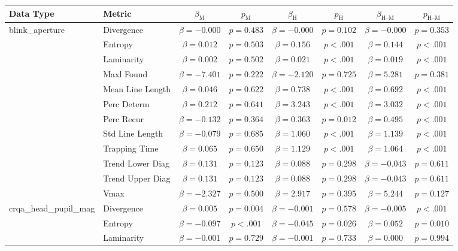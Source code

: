 \begin{tabular}{llcc|cc|cc}
\toprule
Data Type & Metric & $\beta_{\text{M}}$ & $p_{\text{M}}$ & $\beta_{\text{H}}$ & $p_{\text{H}}$ & $\beta_{\text{H--M}}$ & $p_{\text{H--M}}$ \\
\midrule
\multirow{12}{*}{blink_aperture} & Divergence & $\beta = -0.000$ & $p = 0.483$ & $\beta = -0.000$ & $p = 0.102$ & $\beta = -0.000$ & $p = 0.353$ \\
 & Entropy & $\beta = 0.012$ & $p = 0.503$ & $\beta = 0.156$ & $p < .001$ & $\beta = 0.144$ & $p < .001$ \\
 & Laminarity & $\beta = 0.002$ & $p = 0.502$ & $\beta = 0.021$ & $p < .001$ & $\beta = 0.019$ & $p < .001$ \\
 & Maxl Found & $\beta = -7.401$ & $p = 0.222$ & $\beta = -2.120$ & $p = 0.725$ & $\beta = 5.281$ & $p = 0.381$ \\
 & Mean Line Length & $\beta = 0.046$ & $p = 0.622$ & $\beta = 0.738$ & $p < .001$ & $\beta = 0.692$ & $p < .001$ \\
 & Perc Determ & $\beta = 0.212$ & $p = 0.641$ & $\beta = 3.243$ & $p < .001$ & $\beta = 3.032$ & $p < .001$ \\
 & Perc Recur & $\beta = -0.132$ & $p = 0.364$ & $\beta = 0.363$ & $p = 0.012$ & $\beta = 0.495$ & $p < .001$ \\
 & Std Line Length & $\beta = -0.079$ & $p = 0.685$ & $\beta = 1.060$ & $p < .001$ & $\beta = 1.139$ & $p < .001$ \\
 & Trapping Time & $\beta = 0.065$ & $p = 0.650$ & $\beta = 1.129$ & $p < .001$ & $\beta = 1.064$ & $p < .001$ \\
 & Trend Lower Diag & $\beta = 0.131$ & $p = 0.123$ & $\beta = 0.088$ & $p = 0.298$ & $\beta = -0.043$ & $p = 0.611$ \\
 & Trend Upper Diag & $\beta = 0.131$ & $p = 0.123$ & $\beta = 0.088$ & $p = 0.298$ & $\beta = -0.043$ & $p = 0.611$ \\
 & Vmax & $\beta = -2.327$ & $p = 0.500$ & $\beta = 2.917$ & $p = 0.395$ & $\beta = 5.244$ & $p = 0.127$ \\
\midrule
\multirow{12}{*}{crqa_head_pupil_mag} & Divergence & $\beta = 0.005$ & $p = 0.004$ & $\beta = -0.001$ & $p = 0.578$ & $\beta = -0.005$ & $p < .001$ \\
 & Entropy & $\beta = -0.097$ & $p < .001$ & $\beta = -0.045$ & $p = 0.026$ & $\beta = 0.052$ & $p = 0.010$ \\
 & Laminarity & $\beta = -0.001$ & $p = 0.729$ & $\beta = -0.001$ & $p = 0.733$ & $\beta = 0.000$ & $p = 0.994$ \\

\end{tabular}
